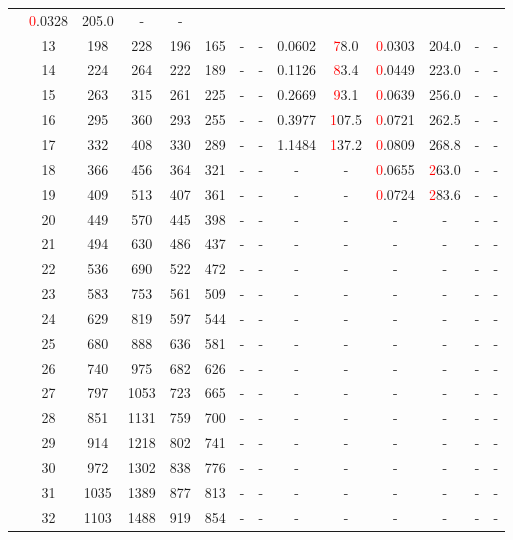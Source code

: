 \begin{table}[htb]
{\begin{tabular}{|c|c|c|c|c|c|c|c|c|c|c|c|c|c|}
 & \textcolor{red}0.0328 & 205.0
 & - & -
 \\
 & 
13 & 198 & 228 & 196 & 165
 & - & -
 & 0.0602 & \textcolor{red}78.0
 & \textcolor{red}0.0303 & 204.0
 & - & -
 \\
 & 
14 & 224 & 264 & 222 & 189
 & - & -
 & 0.1126 & \textcolor{red}83.4
 & \textcolor{red}0.0449 & 223.0
 & - & -
 \\
 & 
15 & 263 & 315 & 261 & 225
 & - & -
 & 0.2669 & \textcolor{red}93.1
 & \textcolor{red}0.0639 & 256.0
 & - & -
 \\
 & 
16 & 295 & 360 & 293 & 255
 & - & -
 & 0.3977 & \textcolor{red}107.5
 & \textcolor{red}0.0721 & 262.5
 & - & -
 \\
 & 
17 & 332 & 408 & 330 & 289
 & - & -
 & 1.1484 & \textcolor{red}137.2
 & \textcolor{red}0.0809 & 268.8
 & - & -
 \\
 & 
18 & 366 & 456 & 364 & 321
 & - & -
 & - & -
 & \textcolor{red}0.0655 & \textcolor{red}263.0
 & - & -
 \\
 & 
19 & 409 & 513 & 407 & 361
 & - & -
 & - & -
 & \textcolor{red}0.0724 & \textcolor{red}283.6
 & - & -
 \\
 & 
20 & 449 & 570 & 445 & 398
 & - & -
 & - & -
 & - & -
 & - & -
 \\
 & 
21 & 494 & 630 & 486 & 437
 & - & -
 & - & -
 & - & -
 & - & -
 \\
 & 
22 & 536 & 690 & 522 & 472
 & - & -
 & - & -
 & - & -
 & - & -
 \\
 & 
23 & 583 & 753 & 561 & 509
 & - & -
 & - & -
 & - & -
 & - & -
 \\
 & 
24 & 629 & 819 & 597 & 544
 & - & -
 & - & -
 & - & -
 & - & -
 \\
 & 
25 & 680 & 888 & 636 & 581
 & - & -
 & - & -
 & - & -
 & - & -
 \\
 & 
26 & 740 & 975 & 682 & 626
 & - & -
 & - & -
 & - & -
 & - & -
 \\
 & 
27 & 797 & 1053 & 723 & 665
 & - & -
 & - & -
 & - & -
 & - & -
 \\
 & 
28 & 851 & 1131 & 759 & 700
 & - & -
 & - & -
 & - & -
 & - & -
 \\
 & 
29 & 914 & 1218 & 802 & 741
 & - & -
 & - & -
 & - & -
 & - & -
 \\
 & 
30 & 972 & 1302 & 838 & 776
 & - & -
 & - & -
 & - & -
 & - & -
 \\
 & 
31 & 1035 & 1389 & 877 & 813
 & - & -
 & - & -
 & - & -
 & - & -
 \\
 & 
32 & 1103 & 1488 & 919 & 854
 & - & -
 & - & -
 & - & -
 & - & -
 \\

\end{tabular}}
\end{table}
